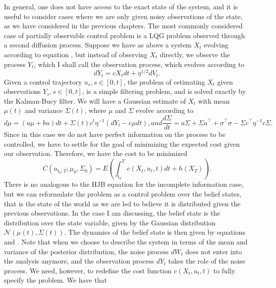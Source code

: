 In general, one does not have access to the exact state of the system, and it is useful to consider cases where we are only given noisy observations of the state, as we have considered in the previous chapters. The most commonly considered case of partially observable control problem is a LQG problem observed through a second diffusion process. Suppose we have as above a system $X_t$ evolving according to equation , but instead of observing $X_t$ directly, we observe the process $Y_t$, which I shall call the observation process, which evolves according to
\begin{equation}
\label{eqn:ctl_obs_dyn}
dY_t = c X_t dt + \eta^{1/2} dV_t.
\end{equation}
Given a control trajectory ${u_s, s\in [0,t]}$, the problem of estimating $X_t$ given observations ${Y_s, s \in [0,t]}$, is a simple filtering problem, and is solved exactly by the Kalman-Bucy filter. We will have a Gaussian estimate of $X_t$ with mean $\mu(t)$ and variance $\Sigma(t)$, where $\mu$ and $\Sigma$ evolve according to
\begin{subequations}
\begin{equation}
d\mu = (a \mu + b u)dt + \Sigma(t) c^t \eta^{-1} \left(dY_t - c\mu dt\right),
\label{eq:ctl_kalman_bucy_mean}
\end{equation}
and
\begin{equation}
\label{eq:ctl_kalman_bucy_var}
\frac{d\Sigma}{dt} = a \Sigma + \Sigma a^\top + \sigma^\top \sigma - \Sigma c^\top \eta^{-1} c \Sigma.
\end{equation}
\end{subequations}
Since in this case we do not have perfect information on the process to be controlled, we have to settle for the goal of minimizing the expected cost given our observation. Therefore, we have the cost to be minimized
$$
C(u_{t_0:T};\mu_0,\Sigma_0) = E\left(\int_{t_0}^T c(X_t,u_t,t)dt +h(X_T)\right).
$$
There is no analogous to the HJB equation for the incomplete information case, but we can reformulate the problem as a control problem over the belief states, that is the state of the world as we are led to believe it is distributed given the previous observations. In the case I am discussing, the belief state is the distribution over the state variable, given by the Gaussian distribution $\mathcal{N}(\mu(t),\Sigma(t))$. The dynamics of the belief state is then given by equations  and . Note that when we choose to describe the system in terms of the mean and variance of the posterior distribution, the noise process $dW_t$ does not enter into the analysis anymore, and the observation process $dY_t$ takes the role of the noise process. We need, however, to redefine the cost function $c(X_t,u_t,t)$ to fully specify the problem. We have that
